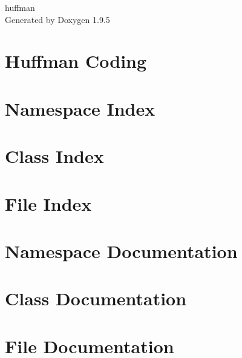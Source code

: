 \documentclass[twoside]{book}
\newcommand{\+}{\discretionary{\mbox{\scriptsize$\hookleftarrow$}}{}{}}
\newcommand{\clearemptydoublepage}{%
    \newpage{\pagestyle{empty}\cleardoublepage}%
  }
\begin{document}
  \raggedbottom
    \hypersetup{pageanchor=false,
                bookmarksnumbered=true,
                pdfencoding=unicode
               }
  \begin{titlepage}
  \vspace*{7cm}
  \begin{center}%
  {\Large huffman}\\
  \vspace*{1cm}
  {\large Generated by Doxygen 1.9.5}\\
  \end{center}
  \end{titlepage}
  \clearemptydoublepage
  \tableofcontents
  \clearemptydoublepage
  \hypersetup{pageanchor=true}
\chapter{Huffman Coding}
\label{index}\hypertarget{index}{}
\chapter{Namespace Index}

\chapter{Class Index}

\chapter{File Index}

\chapter{Namespace Documentation}

\chapter{Class Documentation}

\chapter{File Documentation}



  \backmatter
  \newpage
  \clearemptydoublepage
  \printindex
\end{document}
